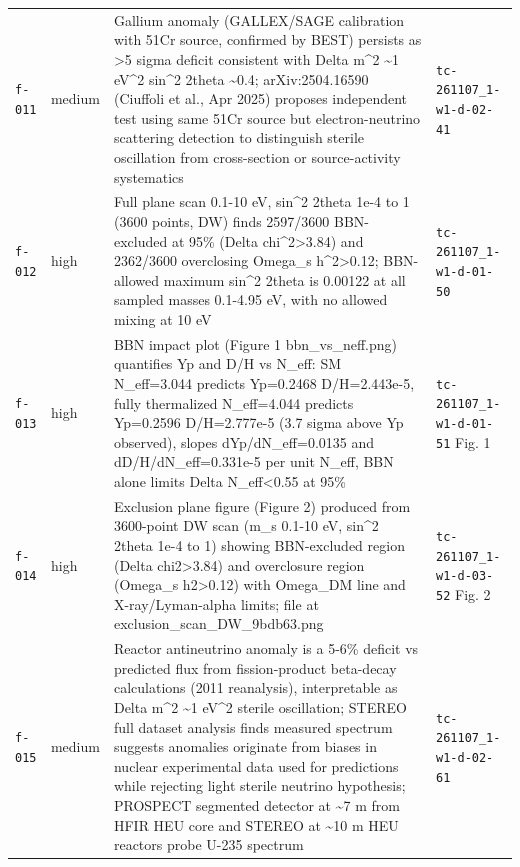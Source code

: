\documentclass[11pt,a4paper]{article}
\begin{document}
\begin{longtable}{@{}p{}p{}p{}p{}@{}}
\texttt{f-011} & medium & Gallium anomaly (GALLEX/SAGE calibration with 51Cr source, confirmed by BEST) persists as \textgreater{}5 sigma deficit consistent with Delta m\textasciicircum{}2 \textasciitilde{}1 eV\textasciicircum{}2 sin\textasciicircum{}2 2theta \textasciitilde{}0.4; arXiv:2504.16590 (Ciuffoli et al., Apr 2025) proposes independent test using same 51Cr source but electron-neutrino scattering detection to distinguish sterile oscillation from cross-section or source-activity systematics & \texttt{tc-261107\_\allowbreak{}1-w1-d-02-41} \\
\texttt{f-012} & high & Full plane scan 0.1-10 eV, sin\textasciicircum{}2 2theta 1e-4 to 1 (3600 points, DW) finds 2597/3600 BBN-excluded at 95\% (Delta chi\textasciicircum{}2\textgreater{}3.84) and 2362/3600 overclosing Omega\_s h\textasciicircum{}2\textgreater{}0.12; BBN-allowed maximum sin\textasciicircum{}2 2theta is 0.00122 at all sampled masses 0.1-4.95 eV, with no allowed mixing at 10 eV & \texttt{tc-261107\_\allowbreak{}1-w1-d-01-50} \\
\texttt{f-013} & high & BBN impact plot (Figure 1 bbn\_vs\_neff.png) quantifies Yp and D/H vs N\_eff: SM N\_eff=3.044 predicts Yp=0.2468 D/H=2.443e-5, fully thermalized N\_eff=4.044 predicts Yp=0.2596 D/H=2.777e-5 (3.7 sigma above Yp observed), slopes dYp/dN\_eff=0.0135 and dD/H/dN\_eff=0.331e-5 per unit N\_eff, BBN alone limits Delta N\_eff\textless{}0.55 at 95\% & \texttt{tc-261107\_\allowbreak{}1-w1-d-01-51} Fig. 1 \\
\texttt{f-014} & high & Exclusion plane figure (Figure 2) produced from 3600-point DW scan (m\_s 0.1-10 eV, sin\textasciicircum{}2 2theta 1e-4 to 1) showing BBN-excluded region (Delta chi2\textgreater{}3.84) and overclosure region (Omega\_s h2\textgreater{}0.12) with Omega\_DM line and X-ray/Lyman-alpha limits; file at exclusion\_scan\_DW\_9bdb63.png & \texttt{tc-261107\_\allowbreak{}1-w1-d-03-52} Fig. 2 \\
\texttt{f-015} & medium & Reactor antineutrino anomaly is a 5-6\% deficit vs predicted flux from fission-product beta-decay calculations (2011 reanalysis), interpretable as Delta m\textasciicircum{}2 \textasciitilde{}1 eV\textasciicircum{}2 sterile oscillation; STEREO full dataset analysis finds measured spectrum suggests anomalies originate from biases in nuclear experimental data used for predictions while rejecting light sterile neutrino hypothesis; PROSPECT segmented detector at \textasciitilde{}7 m from HFIR HEU core and STEREO at \textasciitilde{}10 m HEU reactors probe U-235 spectrum & \texttt{tc-261107\_\allowbreak{}1-w1-d-02-61} \\

\end{longtable}
\end{document}
